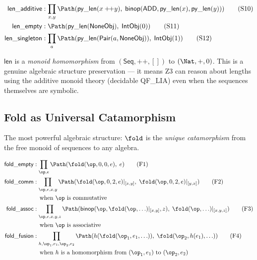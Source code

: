 \begin{definition}
\begin{align}
  \mathsf{len\_additive} &: \prod_{x,y}
    \Path(\mathsf{py\_len}(x +\!\!+ y),\;
          \mathsf{binop}(\mathsf{ADD}, \mathsf{py\_len}(x),
          \mathsf{py\_len}(y)))
    \tag{S10} \\
  \mathsf{len\_empty} &:
    \Path(\mathsf{py\_len}(\mathsf{NoneObj}),\; \mathsf{IntObj}(0))
    \tag{S11} \\
  \mathsf{len\_singleton} &: \prod_a
    \Path(\mathsf{py\_len}(\mathsf{Pair}(a, \mathsf{NoneObj})),\;
          \mathsf{IntObj}(1))
    \tag{S12}
\end{align}
\end{definition}

$\mathsf{len}$ is a \emph{monoid homomorphism} from
$(\mathsf{Seq}, +\!\!+, [])$ to $(\Nat, +, 0)$.  This is a genuine
algebraic structure preservation --- it means Z3 can reason about
lengths using the additive monoid theory (decidable QF\_LIA) even
when the sequences themselves are symbolic.

\subsection{Fold as Universal Catamorphism}

The most powerful algebraic structure: $\fold$ is the
\emph{unique catamorphism} from the free monoid of sequences to
any algebra.

\begin{definition}
\label{def:fold-algebra}
\begin{align}
  \mathsf{fold\_empty} &: \prod_{\op, e}
    \Path(\fold(\op, 0, 0, e),\; e)
    \tag{F1} \\
  \mathsf{fold\_comm} &: \prod_{\op, e, x, y}
    \Path(\fold(\op, 0, 2, e)|_{[x,y]},\;
          \fold(\op, 0, 2, e)|_{[y,x]})
    \tag{F2} \\
  &\quad \text{when $\op$ is commutative} \nonumber \\
  \mathsf{fold\_assoc} &: \prod_{\op, e, x, y, z}
    \Path(\mathsf{binop}(\op, \fold(\op, \ldots)|_{[x,y]}, z),\;
          \fold(\op, \ldots)|_{[x,y,z]})
    \tag{F3} \\
  &\quad \text{when $\op$ is associative} \nonumber \\
  \mathsf{fold\_fusion} &: \prod_{h, \op_1, e_1, \op_2, e_2}
    \Path(h(\fold(\op_1, e_1, \ldots)),\;
          \fold(\op_2, h(e_1), \ldots))
    \tag{F4} \\
  &\quad \text{when $h$ is a homomorphism from $(\op_1, e_1)$ to
    $(\op_2, e_2)$} \nonumber
\end{align}
\end{definition}

